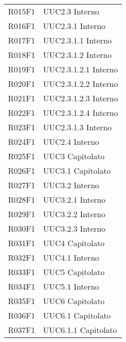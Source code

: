 \documentclass[../analisi-dei-requisiti.tex]{subfiles}
\begin{document}
\begin{longtable}[H]{ p{4cm} | p{4cm} }
  R015F1                               & UUC2.3 Interno                \\
  R016F1                               & UUC2.3.1 Interno              \\
  R017F1                               & UUC2.3.1.1 Interno            \\
  R018F1                               & UUC2.3.1.2 Interno            \\
  R019F1                               & UUC2.3.1.2.1 Interno          \\
  R020F1                               & UUC2.3.1.2.2 Interno          \\
  R021F1                               & UUC2.3.1.2.3 Interno          \\
  R022F1                               & UUC2.3.1.2.4 Interno          \\
  R023F1                               & UUC2.3.1.3 Interno            \\
  R024F1                               & UUC2.4 Interno                \\
  R025F1                               & UUC3 Capitolato               \\
  R026F1                               & UUC3.1 Capitolato             \\
  R027F1                               & UUC3.2 Interno                \\
  R028F1                               & UUC3.2.1 Interno              \\
  R029F1                               & UUC3.2.2 Interno              \\
  R030F1                               & UUC3.2.3 Interno              \\
  R031F1                               & UUC4 Capitolato               \\
  R032F1                               & UUC4.1 Interno                \\
  R033F1                               & UUC5 Capitolato               \\
  R034F1                               & UUC5.1 Interno                \\
  R035F1                               & UUC6 Capitolato               \\
  R036F1                               & UUC6.1 Capitolato             \\
  R037F1                               & UUC6.1.1 Capitolato           \\

\end{longtable}
\end{document}
